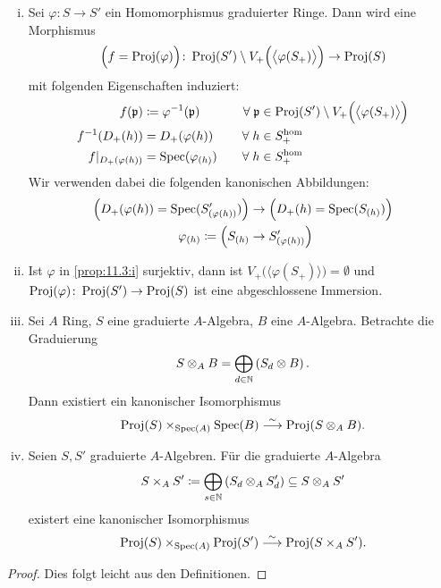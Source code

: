 \begin{prop}
	\label{prop:11.3}
	\begin{enumerate}[i)]
		\item\label{prop:11.3:i} Sei $\varphi \colon S \to S'$ ein Homomorphismus graduierter Ringe. Dann wird eine Morphismus
		\[
			\Big(f = \operatorname{Proj}(\varphi)\Big) \colon \operatorname{Proj}(S') \setminus V_+\Big(\big\langle\varphi(S_+)\big\rangle\Big) \to \operatorname{Proj}(S)
		\]
		mit folgenden Eigenschaften induziert:
		\begin{alignat*}{2}
			f(\mathfrak{p}) &\coloneqq \varphi^{-1}(\mathfrak{p}) \quad & \forall \;\mathfrak{p} &\in \operatorname{Proj}(S') \setminus V_+\Big(\big\langle\varphi(S_+)\big\rangle\Big) \\
			f^{-1} (D_+(h)) &= D_+(\varphi(h))\quad & \forall \;h &\in S_+^{\text{hom}} \\
			f|_{D_+(\varphi(h))} &= \operatorname{Spec}(\varphi_{(h)})\quad & \forall\; h &\in S_+^{\text{hom}}
		\end{alignat*}
		Wir verwenden dabei die folgenden kanonischen Abbildungen:
		\begin{align*}
			\Big(D_+(\varphi(h)) = \operatorname{Spec}(S_{(\varphi(h))}')\Big) & \to \Big(D_+(h) = \operatorname{Spec}(S_{(h)})\Big)\\
			\varphi_{(h)} \coloneqq \Big(S_{(h)} & \to S_{(\varphi(h))}'\Big)
		\end{align*}
		\item\label{prop:11.3:ii} Ist $\varphi$ in \ref{prop:11.3:i} surjektiv, dann ist $V_+\Big(\big\langle\varphi(S_+)\big\rangle\Big) = \emptyset$ und $\operatorname{Proj}(\varphi)\colon\operatorname{Proj}(S') \to \operatorname{Proj}(S)$ ist eine abgeschlossene Immersion.
		\item\label{prop:11.3:iii} Sei $A$ Ring, $S$ eine graduierte $A$-Algebra, $B$ eine $A$-Algebra. Betrachte die Graduierung
		\[
			S \otimes_A B = \bigoplus_{d\in \mathbb {N}} \left( S_d \otimes B \right).
		\]
		Dann existiert ein kanonischer Isomorphismus
		\[
			\operatorname{Proj}(S) \times_{\operatorname{Spec}(A)} \operatorname{Spec}(B) \overset{\sim}{\longrightarrow} \operatorname{Proj}(S \otimes_A B).
		\]
		\item\label{prop:11.3:iv} Seien $S,S'$ graduierte $A$-Algebren. Für die graduierte $A$-Algebra
		\[
			S \times_A S' \coloneqq \bigoplus_{s\in\mathbb {N}} \left( S_d \otimes_A S_d' \right) \subseteq S \otimes_A S'
		\]
		existert eine kanonischer Isomorphismus
		\[
			\operatorname{Proj}(S) \times_{\operatorname{Spec}(A)} \operatorname{Proj}(S') \overset{\sim}{\longrightarrow} \operatorname{Proj}(S \times_A S').
		\]
	\end{enumerate}
	
	\begin{proof}
		Dies folgt leicht aus den Definitionen.
	\end{proof}
\end{prop}

